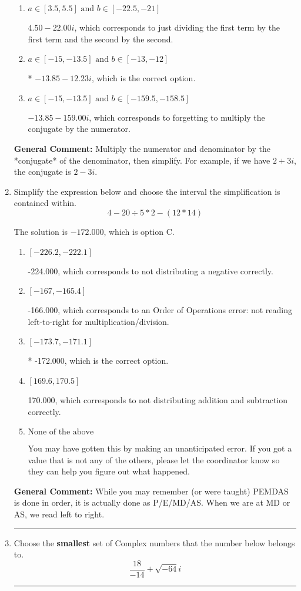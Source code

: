 \documentclass{extbook}[14pt]
\newcommand{\litem}[1]{\item #1

\rule{\textwidth}{0.4pt}}
\begin{document}
\begin{enumerate}
{\begin{enumerate}[label=\Alph*.]
 $16.62  - 8.08 i$, which corresponds to forgetting to multiply the conjugate by the numerator and not computing the conjugate correctly.
\item \( a \in [3.5, 5.5] \text{ and } b \in [-22.5, -21] \)

 $4.50  - 22.00 i$, which corresponds to just dividing the first term by the first term and the second by the second.
\item \( a \in [-15, -13.5] \text{ and } b \in [-13, -12] \)

* $-13.85  - 12.23 i$, which is the correct option.
\item \( a \in [-15, -13.5] \text{ and } b \in [-159.5, -158.5] \)

 $-13.85  - 159.00 i$, which corresponds to forgetting to multiply the conjugate by the numerator.
\end{enumerate}

\textbf{General Comment:} Multiply the numerator and denominator by the *conjugate* of the denominator, then simplify. For example, if we have $2+3i$, the conjugate is $2-3i$.
}
\litem{
Simplify the expression below and choose the interval the simplification is contained within.
\[ 4 - 20 \div 5 * 2 - (12 * 14) \]

The solution is \( -172.000 \), which is option C.\begin{enumerate}[label=\Alph*.]
\item \( [-226.2, -222.1] \)

 -224.000, which corresponds to not distributing a negative correctly.
\item \( [-167, -165.4] \)

 -166.000, which corresponds to an Order of Operations error: not reading left-to-right for multiplication/division.
\item \( [-173.7, -171.1] \)

* -172.000, which is the correct option.
\item \( [169.6, 170.5] \)

 170.000, which corresponds to not distributing addition and subtraction correctly.
\item \( \text{None of the above} \)

 You may have gotten this by making an unanticipated error. If you got a value that is not any of the others, please let the coordinator know so they can help you figure out what happened.
\end{enumerate}

\textbf{General Comment:} While you may remember (or were taught) PEMDAS is done in order, it is actually done as P/E/MD/AS. When we are at MD or AS, we read left to right.
}
\litem{
Choose the \textbf{smallest} set of Complex numbers that the number below belongs to.
\[ \frac{18}{-14}+\sqrt{-64}i \]

}
\end{enumerate}
\end{document}
